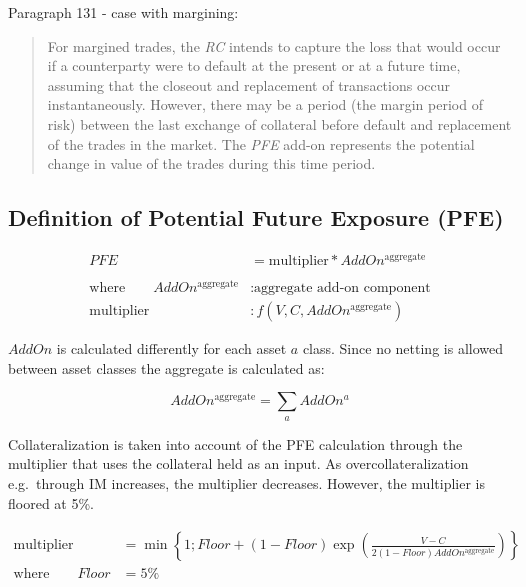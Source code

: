 \documentclass[11pt]{article}
\begin{document}
Paragraph 131 - case with margining:

\begin{quote}
For margined trades, the \emph{RC} intends to capture the loss that
would occur if a counterparty were to default at the present or at a
future time, assuming that the closeout and replacement of transactions
occur instantaneously. However, there may be a period (the margin period
of risk) between the last exchange of collateral before default and
replacement of the trades in the market. The \emph{PFE} add-on
represents the potential change in value of the trades during this time
period.
\end{quote}

    \hypertarget{definition-of-potential-future-exposure-pfe}{%
\subsection{Definition of Potential Future Exposure
(PFE)}\label{definition-of-potential-future-exposure-pfe}}

\begin{align*}
PFE &= \text{multiplier} * AddOn^{\text{aggregate}} \\
\\
\text{where} \qquad AddOn^{\text{aggregate}} &: \text{aggregate add-on component} \\
\text{multiplier} &: f(V,C,AddOn^{\text{aggregate}})
\end{align*}

\(AddOn\) is calculated differently for each asset \(a\) class. Since no
netting is allowed between asset classes the aggregate is calculated as:

\[AddOn^{\text{aggregate}} = \sum_{a}AddOn^{a}\]

Collateralization is taken into account of the PFE calculation through
the multiplier that uses the collateral held as an input. As
overcollateralization e.g.~through IM increases, the multiplier
decreases. However, the multiplier is floored at 5\%.

\begin{align*}
\text{multiplier} &= \min \left\{ 1; Floor + (1-Floor) \exp\left(\frac{V-C}{2(1-Floor)AddOn^{\text{aggregate}}}\right) \right\} \\
\text{where} \qquad Floor &= 5\%
\end{align*}
\end{document}
